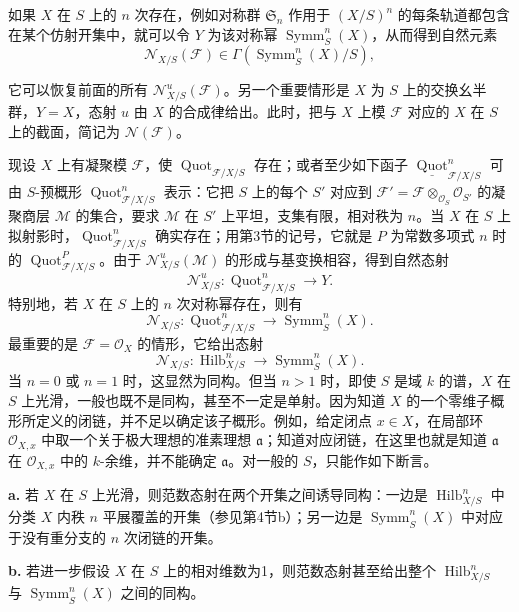 如果 $X$ 在 $S$ 上的 $n$ 次存在，例如对称群 $\mathfrak S_n$ 作用于 $(X/S)^n$ 的每条轨道都包含在某个仿射开集中，就可以令 $Y$ 为该对称幂 $\operatorname{Symm}^n_S(X)$，从而得到自然元素
\[
\mathcal N_{X/S}(\mathcal F)\in\Gamma(\operatorname{Symm}^n_S(X)/S),
\]

它可以恢复前面的所有 $\mathcal N^u_{X/S}(\mathcal F)$。另一个重要情形是 $X$ 为 $S$ 上的交换幺半群，$Y=X$，态射 $u$ 由 $X$ 的合成律给出。此时，把与 $X$ 上模 $\mathcal F$ 对应的 $X$ 在 $S$ 上的截面，简记为 $\mathcal N(\mathcal F)$。

现设 $X$ 上有凝聚模 $\mathcal F$，使 $\operatorname{Quot}_{\mathcal F/X/S}$ 存在；或者至少如下函子 $\underline{\operatorname{Quot}}^n_{\mathcal F/X/S}$ 可由 $S$-预概形 $\operatorname{Quot}^n_{\mathcal F/X/S}$ 表示：它把 $S$ 上的每个 $S'$ 对应到 $\mathcal F'=\mathcal F\otimes_{\mathcal O_S}\mathcal O_{S'}$ 的凝聚商层 $\mathcal M$ 的集合，要求 $\mathcal M$ 在 $S'$ 上平坦，支集有限，相对秩为 $n$。当 $X$ 在 $S$ 上拟射影时，$\operatorname{Quot}^n_{\mathcal F/X/S}$ 确实存在；用第3节的记号，它就是 $P$ 为常数多项式 $n$ 时的 $\operatorname{Quot}^P_{\mathcal F/X/S}$。由于 $\mathcal N^u_{X/S}(\mathcal M)$ 的形成与基变换相容，得到自然态射
\[
\mathcal N^u_{X/S}:\operatorname{Quot}^n_{\mathcal F/X/S}\longrightarrow Y.
\]
特别地，若 $X$ 在 $S$ 上的 $n$ 次对称幂存在，则有
\[
\mathcal N_{X/S}:\operatorname{Quot}^n_{\mathcal F/X/S}
\longrightarrow\operatorname{Symm}^n_S(X).
\]
最重要的是 $\mathcal F=\mathcal O_X$ 的情形，它给出态射
\[
\mathcal N_{X/S}:\operatorname{Hilb}^n_{X/S}
\longrightarrow\operatorname{Symm}^n_S(X).
\]
当 $n=0$ 或 $n=1$ 时，这显然为同构。但当 $n>1$ 时，即使 $S$ 是域 $k$ 的谱，$X$ 在 $S$ 上光滑，一般也既不是同构，甚至不一定是单射。因为知道 $X$ 的一个零维子概形所定义的闭链，并不足以确定该子概形。例如，给定闭点 $x\in X$，在局部环 $\mathcal O_{X,x}$ 中取一个关于极大理想的准素理想 $\mathfrak a$；知道对应闭链，在这里也就是知道 $\mathfrak a$ 在 $\mathcal O_{X,x}$ 中的 $k$-余维，并不能确定 $\mathfrak a$。对一般的 $S$，只能作如下断言。

\noindent\textbf{a.} 若 $X$ 在 $S$ 上光滑，则范数态射在两个开集之间诱导同构：一边是 $\operatorname{Hilb}^n_{X/S}$ 中分类 $X$ 内秩 $n$ 平展覆盖的开集（参见第4节b）；另一边是 $\operatorname{Symm}^n_S(X)$ 中对应于没有重分支的 $n$ 次闭链的开集。

\noindent\textbf{b.} 若进一步假设 $X$ 在 $S$ 上的相对维数为1，则范数态射甚至给出整个 $\operatorname{Hilb}^n_{X/S}$ 与 $\operatorname{Symm}^n_S(X)$ 之间的同构。

